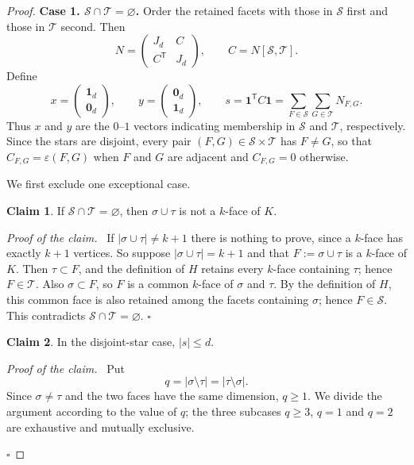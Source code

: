 \documentclass[11pt,reqno]{amsart}
\numberwithin{equation}{section}
\theoremstyle{plain}
\theoremstyle{definition}
\newtheorem{innerclaim}{Claim}
\newenvironment{claim}{\begin{innerclaim}}{\end{innerclaim}}
\newenvironment{claimproof}
  {\par\smallskip\noindent\textit{Proof of the claim.}\ }
  {\hfill$\square$\par\smallskip}
\newcommand{\eps}{\varepsilon}
\newcommand{\ones}{\mathbf{1}}
\newcommand{\T}{\mathsf{T}}
\newcommand{\Sset}{\mathcal S}
\newcommand{\Tset}{\mathcal T}
\begin{document}
\begin{proof}
\medskip
\noindent\textbf{Case 1. $\Sset\cap\Tset=\varnothing$.}
Order the retained facets with those in $\Sset$ first and those in $\Tset$ second. Then
\[
  N=
  \begin{pmatrix}
    J_d & C\\
    C^{\T} & J_d
  \end{pmatrix},
  \qquad
  C=N[\Sset,\Tset] .
\]
Define
\[
  x=\begin{pmatrix}\ones_d\\\mathbf{0}_d\end{pmatrix},
  \qquad
  y=\begin{pmatrix}\mathbf{0}_d\\\ones_d\end{pmatrix},
  \qquad
  s=\ones^{\T}C\ones
   =\sum_{F\in\Sset}\sum_{G\in\Tset}N_{F,G} .
\]
Thus $x$ and $y$ are the $0$--$1$ vectors indicating membership in $\Sset$ and $\Tset$,
respectively. Since the stars are disjoint, every pair $(F,G)\in\Sset\times\Tset$ has
$F\ne G$, so that $C_{F,G}=\eps(F,G)$ when $F$ and $G$ are adjacent and $C_{F,G}=0$ otherwise.

We first exclude one exceptional case.

\begin{claim}\label{cl:pivot}
If $\Sset\cap\Tset=\varnothing$, then $\sigma\cup\tau$ is not a $k$-face of $K$.
\end{claim}

\begin{claimproof}
If $|\sigma\cup\tau|\ne k+1$ there is nothing to prove, since a $k$-face has exactly $k+1$
vertices. So suppose $|\sigma\cup\tau|=k+1$ and that $F:=\sigma\cup\tau$ is a $k$-face of
$K$. Then $\tau\subset F$, and the definition of $H$ retains every $k$-face containing $\tau$;
hence $F\in\Tset$. Also $\sigma\subset F$, so $F$ is a common $k$-face of $\sigma$ and $\tau$.
By the definition of $H$, this common face is also retained among the facets containing
$\sigma$; hence $F\in\Sset$. This contradicts
$\Sset\cap\Tset=\varnothing$.
\end{claimproof}

\begin{claim}\label{cl:s}
In the disjoint-star case, $|s|\le d$.
\end{claim}

\begin{claimproof}
Put
\[
  q=|\sigma\setminus\tau|=|\tau\setminus\sigma| .
\]
Since $\sigma\ne\tau$ and the two faces have the same dimension, $q\ge1$. We divide the
argument according to the value of $q$; the three subcases $q\ge3$, $q=1$ and $q=2$ are
exhaustive and mutually exclusive.


\end{claimproof}
\end{proof}
\end{document}
